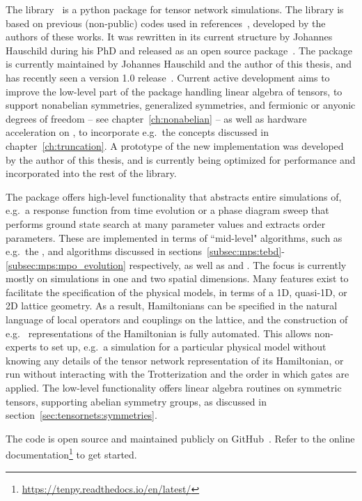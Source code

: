 The  library~\cite{tenpySoftware} is a python package for tensor network simulations.
%
The library is based on previous (non-public) codes used in references~\cite{kjall2013, zaletel2013}, developed by the authors of these works.
%
It was rewritten in its current structure by Johannes Hauschild during his PhD and released as an open source package~\cite{hauschild2018b}.
%
The package is currently maintained by Johannes Hauschild and the author of this thesis, and has recently seen a version 1.0 release~\cite{hauschild2024}.
%
Current active development aims to improve the low-level part of the package handling linear algebra of tensors, to support nonabelian symmetries, generalized symmetries, and fermionic or anyonic degrees of freedom -- see chapter~\ref{ch:nonabelian} -- as well as hardware acceleration on , to incorporate e.g.~the concepts discussed in chapter~\ref{ch:truncation}.
%
A prototype of the new implementation was developed by the author of this thesis, and is currently being optimized for performance and incorporated into the rest of the library.


The package offers high-level functionality that abstracts entire simulations of, e.g.~a response function from time evolution or a phase diagram sweep that performs ground state search at many parameter values and extracts order parameters.
%
These are implemented in terms of ``mid-level" algorithms, such as e.g.~the ,  and  algorithms discussed in sections~\ref{subsec:mps:tebd}-\ref{subsec:mps:mpo_evolution} respectively, as well as  and .
%
The focus is currently mostly on  simulations in one and two spatial dimensions.
%
Many features exist to facilitate the specification of the physical models, in terms of a 1D, quasi-1D, or 2D lattice geometry.
%
As a result, Hamiltonians can be specified in the natural language of local operators and couplings on the lattice, and the construction of e.g.~ representations of the Hamiltonian is fully automated.
%
This allows non-experts to set up, e.g.~a  simulation for a particular physical model without knowing any details of the tensor network representation of its Hamiltonian, or run  without interacting with the Trotterization and the order in which gates are applied.
%
The low-level functionality offers linear algebra routines on symmetric tensors, supporting abelian symmetry groups, as discussed in section~\ref{sec:tensornets:symmetries}.

%
The code is open source and maintained publicly on GitHub~\cite{tenpySoftware}.
%
Refer to the online documentation\footnote{
    \url{https://tenpy.readthedocs.io/en/latest/}
}
to get started.
